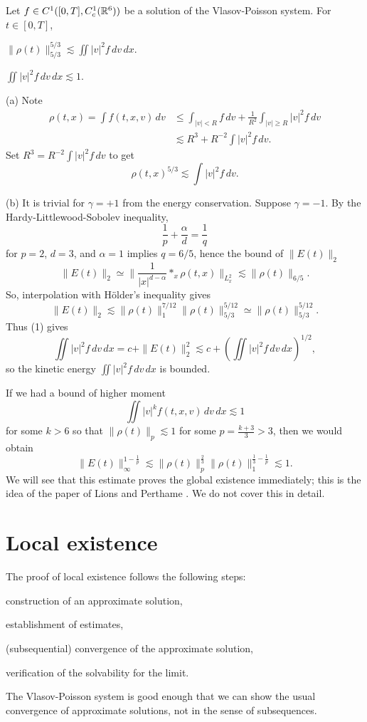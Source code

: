 \documentclass{article}
\begin{document}
\begin{lem}
Let $f\in C^1([0,T],C_c^1(\mathbb{R}^6))$ be a solution of the Vlasov-Poisson system.
For $t\in[0,T]$,
\begin{parts}
\item $\|\rho(t)\|_{5/3}^{5/3}\lesssim\iint|v|^2f\,dv\,dx$.
\item $\iint|v|^2f\,dv\,dx\lesssim1$.
\end{parts}
\end{lem}
\begin{pf}
(a)
Note
\begin{align*}
\rho(t,x)=\int f(t,x,v)\,dv
&\le\int_{|v|<R}f\,dv+\frac1{R^2}\int_{|v|\ge R}|v|^2f\,dv\\
&\lesssim R^3+ R^{-2}\int|v|^2f\,dv.
\end{align*}
Set $R^3=R^{-2}\int|v|^2f\,dv$ to get
\[\rho(t,x)^{5/3}\lesssim\int|v|^2f\,dv.\]

(b)
It is trivial for $\gamma=+1$ from the energy conservation.
Suppose $\gamma=-1$.
By the Hardy-Littlewood-Sobolev inequality,
\[\frac1p+\frac\alpha d=\frac1q\]
for $p=2$, $d=3$, and $\alpha=1$ implies $q=6/5$, hence the bound of $\|E(t)\|_2$
\[\|E(t)\|_2\simeq\|\frac1{|x|^{d-\alpha}}*_x\rho(t,x)\|_{L_x^2}\lesssim\|\rho(t)\|_{6/5}.\]
So, interpolation with H\"older's inequality gives
\[\|E(t)\|_2\lesssim\|\rho(t)\|_1^{7/12}\|\rho(t)\|_{5/3}^{5/12}\simeq\|\rho(t)\|_{5/3}^{5/12}.\]
Thus (1) gives
\[\iint|v|^2f\,dv\,dx=c+\|E(t)\|_2^2\lesssim c+(\iint|v|^2f\,dv\,dx)^{1/2},\]
so the kinetic energy $\iint|v|^2f\,dv\,dx$ is bounded.\qedhere
\end{pf}

\begin{rmk}
If we had a bound of higher moment
\[\iint|v|^kf(t,x,v)\,dv\,dx\lesssim1\]
for some $k>6$ so that $\|\rho(t)\|_p\lesssim1$ for some $p=\frac{k+3}3>3$, then we would obtain
\[\|E(t)\|_\infty^{1-\frac1p}\lesssim\|\rho(t)\|_p^{\frac23}\|\rho(t)\|_1^{\frac13-\frac1p}\lesssim1.\]
We will see that this estimate proves the global existence immediately; this is the idea of the paper of Lions and Perthame \cite{lions1991propagation}.
We do not cover this in detail.
\end{rmk}




\section{Local existence}

The proof of local existence follows the following steps:
\begin{parts}
\item construction of an approximate solution,
\item establishment of estimates,
\item (subsequential) convergence of the approximate solution,
\item verification of the solvability for the limit.
\end{parts}
The Vlasov-Poisson system is good enough that we can show the usual convergence of approximate solutions, not in the sense of subsequences.
\end{document}
